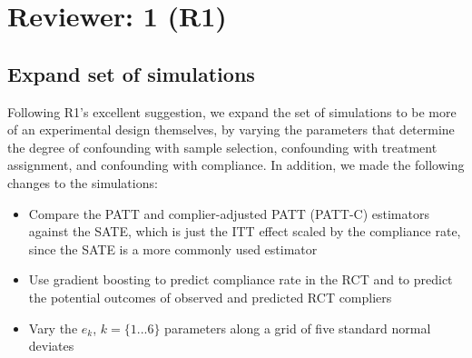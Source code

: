 \documentclass[hidelinks,12pt,letterpaper]{article}
\begin{document}
 

\tableofcontents

\pagebreak

\section{Reviewer: 1 (R1)}

\subsection{Expand set of simulations}



Following R1's excellent suggestion, we expand the set of simulations to be more of an experimental design themselves, by varying the parameters that determine the degree of confounding with sample selection, confounding with treatment assignment, and confounding with compliance. In addition, we made the following changes to the simulations:

\begin{itemize}
	\item Compare the PATT and complier-adjusted PATT (PATT-C) estimators against the SATE, which is just the ITT effect scaled by the compliance rate, since the SATE is a more commonly used estimator
	\item Use gradient boosting to predict compliance rate in the RCT and to predict the potential outcomes of observed and predicted RCT compliers
	\item Vary the $e_k$, $k = \{1...6\}$ parameters along a grid of five standard normal deviates
\end{itemize}
\end{document}
